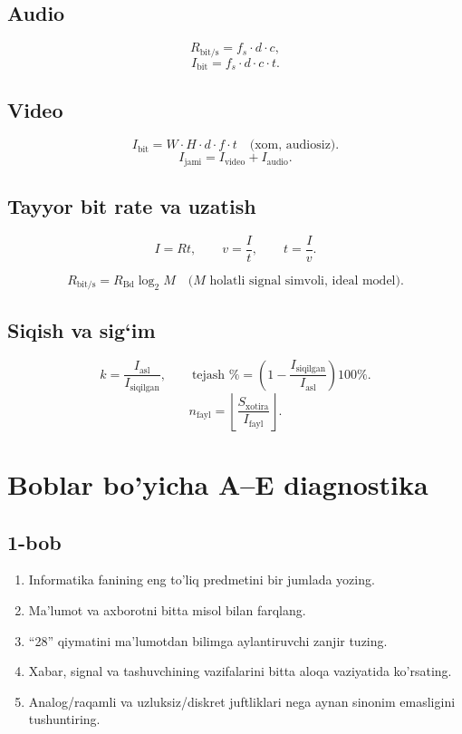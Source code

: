\documentclass[11pt,a4paper,oneside]{book}
\newcommand{\bit}{\mathrm{bit}}
\begin{document}
\section{Audio}

\[
R_{\bit/\mathrm{s}}=f_s\cdot d\cdot c,
\]
\[
I_{\bit}=f_s\cdot d\cdot c\cdot t.
\]

\section{Video}

\[
I_{\bit}=W\cdot H\cdot d\cdot f\cdot t
\quad\text{(xom, audiosiz)}.
\]
\[
I_{\text{jami}}=I_{\text{video}}+I_{\text{audio}}.
\]

\section{Tayyor bit rate va uzatish}

\[
I=Rt,\qquad
v=\frac{I}{t},\qquad
t=\frac{I}{v}.
\]

\[
R_{\bit/\mathrm{s}}=R_{\mathrm{Bd}}\log_2M
\quad\text{(\(M\) holatli signal simvoli, ideal model)}.
\]

\section{Siqish va sig‘im}

\[
k=\frac{I_{\text{asl}}}{I_{\text{siqilgan}}},
\qquad
\text{tejash \%}=
\left(1-\frac{I_{\text{siqilgan}}}{I_{\text{asl}}}\right)100\%.
\]
\[
n_{\text{fayl}}=
\left\lfloor\frac{S_{\text{xotira}}}{I_{\text{fayl}}}\right\rfloor.
\]
\chapter*{Boblar bo'yicha A--E diagnostika}
\section*{1-bob}
\begin{enumerate}
\item[A.] Informatika fanining eng to'liq predmetini bir jumlada yozing.
\item[B.] Ma'lumot va axborotni bitta misol bilan farqlang.
\item[C.] ``28'' qiymatini ma'lumotdan bilimga aylantiruvchi zanjir tuzing.
\item[D.] Xabar, signal va tashuvchining vazifalarini bitta aloqa vaziyatida ko'rsating.
\item[E.] Analog/raqamli va uzluksiz/diskret juftliklari nega aynan sinonim emasligini tushuntiring.
\end{enumerate}
\end{document}
